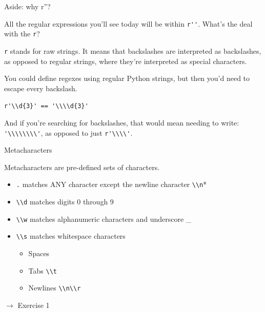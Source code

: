 \documentclass{beamer}
\begin{document}
\begin{frame}{Aside: why r''?}

All the regular expressions you'll see today will be within \lstinline$r''$.
What's the deal with the \lstinline$r$?

\bigskip

\lstinline$r$ stands for raw strings. It means that backslashes are interpreted
as backslashes, as opposed to regular strings, where they're interpreted as
special characters.

\bigskip

You could define regexes using regular Python strings, but then you'd need
to escape every backslash.

\begin{center}
\lstinline$r'\\d{3}' == '\\\\d{3}'$
\end{center}

And if you're searching for backslashes, that would mean needing to write:
\lstinline$'\\\\\\\\'$, as opposed to just \lstinline$r'\\\\'$.

\end{frame}

\begin{frame}{Metacharacters}

Metacharacters are pre-defined sets of characters.
 \begin{itemize}
  \item \lstinline$.$ matches ANY character except the newline character \lstinline$\\n$*
  \item \lstinline$\\d$ matches digits 0 through 9
  \item \lstinline$\\w$ matches alphanumeric characters and underscore \_
  \item \lstinline$\\s$ matches whitespace characters
    \begin{itemize}
     \item Spaces 
     \item Tabs \lstinline$\\t$
     \item Newlines \lstinline$\\n\\r$
    \end{itemize}
 \end{itemize}

 \bigskip
 $\rightarrow$ Exercise 1
\end{frame}
\end{document}
